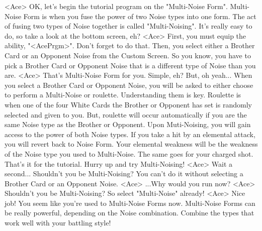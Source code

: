 <Ace> OK, let's begin the tutorial program on the "Multi-Noise Form". 
Multi-Noise Form is when you fuse the power of two Noise types into one form. 
The act of fusing two types of Noise together is called "Multi-Noising". 
It's really easy to do, so take a look at the bottom screen, eh? 
<Ace> First, you must equip the ability, "<AcePrgm>". Don't forget to do that. 
Then, you select either a Brother Card or an 
Opponent Noise from the Custom Screen. 
So you know, you have to pick a Brother Card or 
Opponent Noise that is a different type of Noise than you are. 
<Ace> That's Multi-Noise Form for you. Simple, eh? But, oh yeah... 
When you select a Brother Card or Opponent Noise, you will be asked to either 
choose to perform a Multi-Noise or roulette. Understanding them is key. 
Roulette is when one of the four White Cards the Brother or Opponent has 
set is randomly selected and given to you. 
But, roulette will occur automatically if you are the 
same Noise type as the Brother or Opponent. 
Upon Muti-Noising, you will gain access to the power of both Noise types. 
If you take a hit by an elemental attack, you will revert back to Noise Form. 
Your elemental weakness will be the weakness of the 
Noise type you used to Multi-Noise. 
The same goes for your charged shot. 
That's it for the tutorial. Hurry up and try Multi-Noising! 
<Ace> Wait a second... Shouldn't you be Multi-Noising? 
You can't do it without selecting a Brother Card or an Opponent Noise. 
<Ace> ...Why would you run now? 
<Ace> Shouldn't you be Multi-Noising? So select "Multi-Noise" already! 
<Ace> Nice job! You seem like you're used to Multi-Noise Forms now. 
Multi-Noise Forms can be really powerful, depending on the Noise combination. 
Combine the types that work well with your battling style! 
